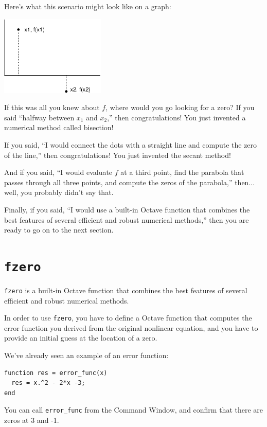\documentclass{book}
\begin{document}
Here's what this scenario might look like on a graph:

\beforefig \centerline{\includegraphics[height=1.5in]{figs/secant.eps}}

If this was all you knew about $f$, where would you go looking for
a zero? If you said ``halfway between $x_1$ and $x_2$,'' then
congratulations! You just invented a numerical method called
bisection!

If you said, ``I would connect the dots with a straight line
and compute the zero of the line,'' then
congratulations! You just invented the secant method!

And if you said, ``I would evaluate $f$ at a third point, find the
parabola that passes through all three points, and compute the zeros
of the parabola,'' then... well, you probably didn't say that.

Finally, if you said, ``I would use a built-in Octave function that
combines the best features of several efficient and robust
numerical methods,'' then you are ready to go on to the next section.


\section{{\tt fzero}}
\label{fzero}

{\tt fzero} is a built-in Octave function that
combines the best features of several efficient and robust
numerical methods.

In order to use {\tt fzero}, you have to define a Octave function
that computes the error function you derived from the original
nonlinear equation, and you have to provide an initial guess at
the location of a zero.

We've already seen an example of an error function:

\begin{verbatim}
function res = error_func(x)
  res = x.^2 - 2*x -3;
end
\end{verbatim}

You can call {\tt error\_func} from the Command Window, and
confirm that there are zeros at 3 and -1.
\end{document}
